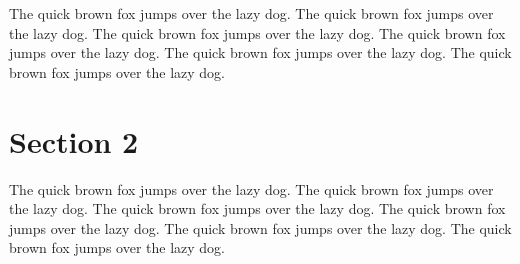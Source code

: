 \documentclass[11pt,a4paper]{report}
\begin{document}
The quick brown fox jumps over the lazy dog. The quick brown fox jumps over the lazy dog. The quick brown fox jumps over the lazy dog. The quick brown fox jumps over the lazy dog. The quick brown fox jumps over the lazy dog. The quick brown fox jumps over the lazy dog. 

\section{Section 2}
\label{sec:sec2}

The quick brown fox jumps over the lazy dog. The quick brown fox jumps over the lazy dog. The quick brown fox jumps over the lazy dog. The quick brown fox jumps over the lazy dog. The quick brown fox jumps over the lazy dog. The quick brown fox jumps over the lazy dog. 


\printbibliography[title={References}]
\end{document}
